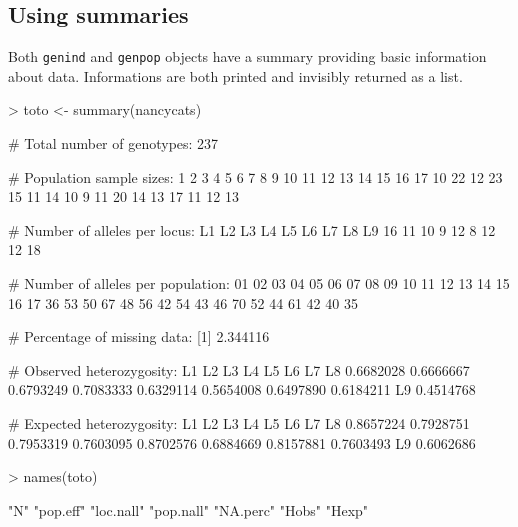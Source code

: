 \documentclass{article}
\begin{document}
\subsection{Using summaries}
Both \texttt{genind} and \texttt{genpop} objects have a summary providing basic information about data.
Informations are both printed and invisibly returned as a list.

\begin{Schunk}
\begin{Sinput}
> toto <- summary(nancycats)
\end{Sinput}
\begin{Soutput}
 # Total number of genotypes:  237 

 # Population sample sizes:  
 1  2  3  4  5  6  7  8  9 10 11 12 13 14 15 16 17 
10 22 12 23 15 11 14 10  9 11 20 14 13 17 11 12 13 

 # Number of alleles per locus:  
L1 L2 L3 L4 L5 L6 L7 L8 L9 
16 11 10  9 12  8 12 12 18 

 # Number of alleles per population:  
01 02 03 04 05 06 07 08 09 10 11 12 13 14 15 16 17 
36 53 50 67 48 56 42 54 43 46 70 52 44 61 42 40 35 

 # Percentage of missing data:  
[1] 2.344116

 # Observed heterozygosity:  
       L1        L2        L3        L4        L5        L6        L7        L8 
0.6682028 0.6666667 0.6793249 0.7083333 0.6329114 0.5654008 0.6497890 0.6184211 
       L9 
0.4514768 

 # Expected heterozygosity:  
       L1        L2        L3        L4        L5        L6        L7        L8 
0.8657224 0.7928751 0.7953319 0.7603095 0.8702576 0.6884669 0.8157881 0.7603493 
       L9 
0.6062686 
\end{Soutput}
\begin{Sinput}
> names(toto)
\end{Sinput}
\begin{Soutput}
[1] "N"        "pop.eff"  "loc.nall" "pop.nall" "NA.perc"  "Hobs"     "Hexp"    
\end{Soutput}
\end{Schunk}
\end{document}
